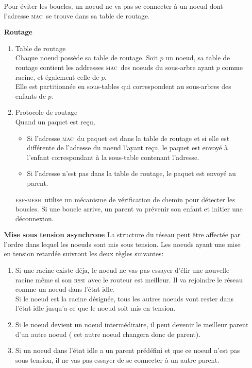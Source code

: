 \documentclass[a4paper, 12pt]{report}
\newcommand{\espmesh}{\textsc{esp-mesh}}
\newcommand{\mac}{\textsc{mac}}
\newcommand{\rssi}{\textsc{rssi}}
\begin{document}
    Pour éviter les boucles, un noeud ne va pas se connecter à un noeud dont l'adresse \mac\ se trouve dans sa table de routage.
    \vspace{0.5cm}

    \textbf{Routage}\newline
        \begin{enumerate}
            \item Table de routage\\
                Chaque noeud possède sa table de routage. Soit $p$ un noeud, sa table de routage contient les addresses \mac\ 
                des noeuds du sous-arbre ayant $p$ comme racine, et également celle de $p$.\\
                Elle est partitionnée en sous-tables qui correspondent au sous-arbres des enfants de $p$.
            \item Protocole de routage\\
                Quand un paquet est reçu,
                \begin{itemize}
                    \item Si l'adresse \mac\ du paquet est dans la table de routage et si elle est différente de l'adresse du noeud l'ayant reçu, le paquet est envoyé
                    à l'enfant correspondant à la sous-table contenant l'adresse.
                    \item Si l'adresse n'est pas dans la table de routage, le paquet est envoyé au parent.
                \end{itemize}
                \espmesh\ utilise un mécanisme de vérification de chemin pour détecter les boucles. Si une boucle arrive, un parent va prévenir son enfant et initier une déconnexion.

        \end{enumerate}
        \vspace{0.5cm}
    \newpage
    \textbf{Mise sous tension asynchrone}\newline
        La structure du réseau peut être affectée par l'ordre dans lequel les noeuds sont mis sous tension.
        Les noeuds ayant une mise en tension retardée suivront les deux règles suivantes:
        \begin{enumerate}
            \item Si une racine existe déja, le noeud ne vas pas essayer d'élir une nouvelle racine
                même si son \rssi\ avec le routeur est meilleur. Il va rejoindre le réseau comme un noeud
                dans l'état idle. \\
                Si le noeud est la racine désignée, tous les autres noeuds vont rester dans l'état idle
                jusqu'a ce que le noeud soit mis en tension.
            \item Si le noeud devient un noeud intermédiraire, il peut devenir le meilleur parent d'un autre noeud ( cet autre noeud changera donc de parent).
            \item Si un noeud dans l'état idle a un parent prédéfini et que ce noeud n'est pas sous tension, il ne vas pas essayer de se connecter à un autre parent.
        \end{enumerate}
\end{document}
